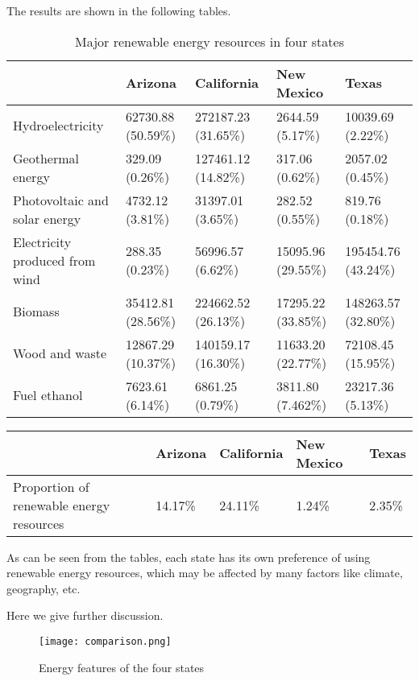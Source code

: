 \documentclass{mcmthesis}
\begin{document}
The results are shown in the following tables.
\begin{table}[h]
\begin{tabularx}{\textwidth}{p{3.3cm}|XXXX}
& Arizona	& California & New Mexico & Texas \\ \hline
Hydroelectricity	& 62730.88 (50.59\%) & 272187.23 (31.65\%) & 2644.59 (5.17\%) & 10039.69 (2.22\%) \\ \hline
Geothermal energy & 329.09 (0.26\%) &127461.12 (14.82\%) & 317.06 (0.62\%) & 2057.02 (0.45\%) \\ \hline
Photovoltaic and solar energy & 4732.12 (3.81\%) & 31397.01 (3.65\%) & 282.52 (0.55\%) & 819.76 (0.18\%) \\ \hline
Electricity produced from wind & 288.35 (0.23\%) & 56996.57 (6.62\%) & 15095.96 (29.55\%) & 195454.76 (43.24\%) \\ \hline
Biomass & 35412.81 (28.56\%) & 224662.52 (26.13\%) & 17295.22 (33.85\%) & 148263.57 (32.80\%) \\ \hline
Wood and waste & 12867.29 (10.37\%) & 140159.17 (16.30\%) & 11633.20 (22.77\%) & 72108.45 (15.95\%) \\ \hline
Fuel ethanol & 7623.61 (6.14\%) & 6861.25 (0.79\%) & 3811.80 (7.462\%) & 23217.36 (5.13\%) \end{tabularx}
\caption{Major renewable energy resources in four states}
\label{table:name_1}
\end{table}
\begin{table}[h]
\begin{tabularx}{\textwidth}{p{4cm}|XXXX}
& Arizona	& California & New Mexico & Texas \\ \hline
Proportion of renewable energy resources & 14.17\% & 24.11\% & 1.24\% & 2.35\%
\end{tabularx}
\label{table:name_2}
\end{table}

As can be seen from the tables, each state has its own preference of using renewable energy resources, which may be affected by many factors like climate, geography, etc.

Here we give further discussion.

\begin{figure}[!h]
     \centering
     \texttt{[image: comparison.png]}
     \caption{Energy features of the four states}
     \label{fig:com}
\end{figure}
\end{document}
